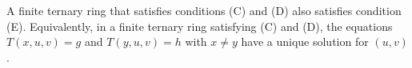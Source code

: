 A finite ternary ring that satisfies conditions (C) and (D) also satisfies condition (E). Equivalently, in a finite ternary ring satisfying (C) and (D), the equations $T(x, u, v) = g$ and $T(y, u, v) = h$ with $x \neq y$ have a unique solution for $(u, v)$.
